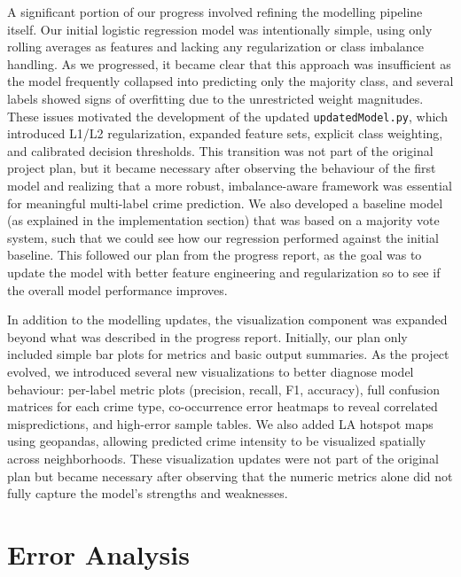 \documentclass[11pt]{article}
\begin{document}
A significant portion of our progress involved refining the modelling pipeline itself. Our initial logistic regression model was intentionally simple, using only rolling averages as features and lacking any regularization or class imbalance handling. As we progressed, it became clear that this approach was insufficient as the model frequently collapsed into predicting only the majority class, and several labels showed signs of overfitting due to the unrestricted weight magnitudes. These issues motivated the development of the updated \texttt{updatedModel.py}, which introduced L1/L2 regularization, expanded feature sets, explicit class weighting, and calibrated decision thresholds. This transition was not part of the original project plan, but it became necessary after observing the behaviour of the first model and realizing that a more robust, imbalance-aware framework was essential for meaningful multi-label crime prediction. We also developed a baseline model (as explained in the implementation section) that was based on a majority vote system, such that we could see how our regression performed against the initial baseline. This followed our plan from the progress report, as the goal was to update the model with better feature engineering and regularization so to see if the overall model performance improves. 

In addition to the modelling updates, the visualization component was expanded beyond what was described in the progress report. Initially, our plan only included simple bar plots for metrics and basic output summaries. As the project evolved, we introduced several new visualizations to better diagnose model behaviour: per-label metric plots (precision, recall, F1, accuracy), full confusion matrices for each crime type, co-occurrence error heatmaps to reveal correlated mispredictions, and high-error sample tables. We also added LA hotspot maps using geopandas, allowing predicted crime intensity to be visualized spatially across neighborhoods. These visualization updates were not part of the original plan but became necessary after observing that the numeric metrics alone did not fully capture the model's strengths and weaknesses.


\section{Error Analysis}
\end{document}
